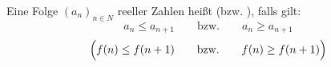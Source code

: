 Eine Folge $(a_n)_{n \in N}$ reeller Zahlen heißt  (bzw. ), falls gilt:
$$a_n \leq a_{n+1} \qquad \text{bzw.} \qquad a_n \geq a_{n+1}$$
$$\Bigl(f(n) \leq f(n+1) \qquad \text{bzw.} \qquad f(n) \geq f(n+1)\Bigl)$$